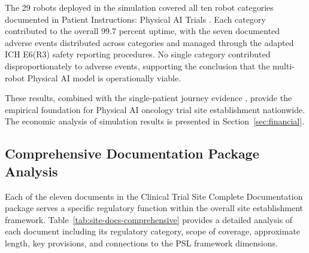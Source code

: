 The 29 robots deployed in the simulation covered all ten robot categories
documented in Patient Instructions: Physical AI Trials
\cite{patient-instructions-paper}. Each category contributed to the overall
99.7 percent uptime, with the seven documented adverse events distributed
across categories and managed through the adapted ICH E6(R3) safety reporting
procedures. No single category contributed disproportionately to adverse
events, supporting the conclusion that the multi-robot Physical AI model is
operationally viable.

These results, combined with the single-patient journey evidence
\cite{patient-journey-paper}, provide the empirical foundation for Physical AI
oncology trial site establishment nationwide. The economic analysis of
simulation results is presented in Section~\ref{sec:financial}.

\subsection{Comprehensive Documentation Package Analysis}
\label{subsec:site-docs-comprehensive}

Each of the eleven documents in the Clinical Trial Site Complete Documentation
package serves a specific regulatory function within the overall site
establishment framework. Table~\ref{tab:site-docs-comprehensive} provides a
detailed analysis of each document including its regulatory category, scope of
coverage, approximate length, key provisions, and connections to the PSL
framework dimensions.

